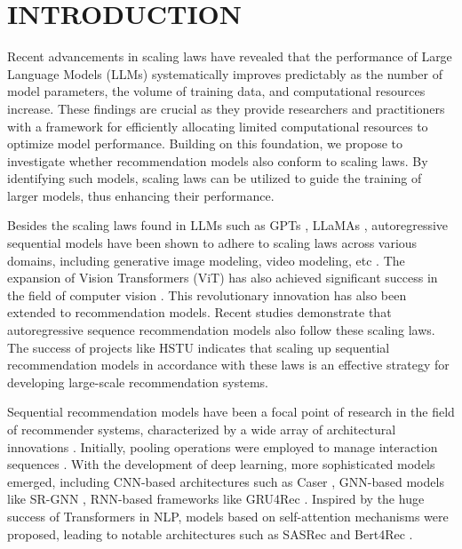 \section{INTRODUCTION}

Recent advancements \cite{gpt3, achiam2023gpt4, kaplan2020scaling, guo2024scaling} in scaling laws have revealed that the performance of Large Language Models (LLMs) systematically improves predictably as the number of model parameters, the volume of training data, and computational resources increase. These findings are crucial as they provide researchers and practitioners with a framework for efficiently allocating limited computational resources to optimize model performance. Building on this foundation, we propose to investigate whether recommendation models also conform to scaling laws. By identifying such models, scaling laws can be utilized to guide the training of larger models, thus enhancing their performance.

Besides the scaling laws found in LLMs such as GPTs \cite{gpt3, achiam2023gpt4}, LLaMAs \cite{touvron2023llama, dubey2024llama}, autoregressive sequential models have been shown to adhere to scaling laws across various domains, including generative image modeling, video modeling, etc \cite{henighan2020scaling}.  
The expansion of Vision Transformers (ViT) has also achieved significant success in the field of computer vision \cite{zhai2022scalingvisiontransformers, dehghani2023scalingvisiontransformers22}.
This revolutionary innovation has also been extended to recommendation models.
Recent studies \cite{zhang2023scaling, shen2024predictive} demonstrate that autoregressive sequence recommendation models also follow these scaling laws. The success of projects like HSTU \cite{hstu, chen2024hllm, wu2024survey} indicates that scaling up sequential recommendation models in accordance with these laws is an effective strategy for developing large-scale recommendation systems.

Sequential recommendation models have been a focal point of research in the field of recommender systems, characterized by a wide array of architectural innovations \cite{xie2024breaking, yin2024dataset, xie2024bridging, shen2024exploring, wangmf, liu2023user,wang2021hypersorec}.
Initially, pooling operations were employed to manage interaction sequences \cite{covington2016deep}. 
With the development of deep learning, more sophisticated models emerged, including CNN-based architectures such as Caser \cite{caser}, GNN-based models like SR-GNN \cite{wu2019session}, RNN-based frameworks like GRU4Rec \cite{hidasi2015session}. Inspired by the huge success of Transformers in NLP, models based on self-attention mechanisms were proposed, leading to notable architectures such as SASRec \cite{kang2018self} and Bert4Rec \cite{bert4rec}.

